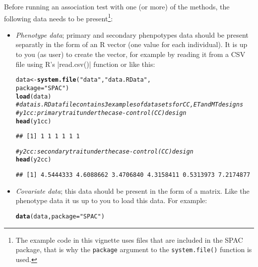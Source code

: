 \documentclass{article}\usepackage[]{graphicx}\usepackage[]{color}
\makeatletter
\newcommand{\hlstr}[1]{\textcolor[rgb]{0.192,0.494,0.8}{#1}}%
\newcommand{\hlcom}[1]{\textcolor[rgb]{0.678,0.584,0.686}{\textit{#1}}}%
\newcommand{\hlstd}[1]{\textcolor[rgb]{0.345,0.345,0.345}{#1}}%
\newcommand{\hlkwb}[1]{\textcolor[rgb]{0.69,0.353,0.396}{#1}}%
\newcommand{\hlkwc}[1]{\textcolor[rgb]{0.333,0.667,0.333}{#1}}%
\newcommand{\hlkwd}[1]{\textcolor[rgb]{0.737,0.353,0.396}{\textbf{#1}}}%
\newenvironment{kframe}{%
 \def\at@end@of@kframe{}%
 \ifinner\ifhmode%
  \def\at@end@of@kframe{\end{minipage}}%
  \begin{minipage}{\columnwidth}%
 \fi\fi%
 \def\FrameCommand##1{\hskip\@totalleftmargin \hskip-\fboxsep
 \colorbox{shadecolor}{##1}\hskip-\fboxsep
     \hskip-\linewidth \hskip-\@totalleftmargin \hskip\columnwidth}%
 \MakeFramed {\advance\hsize-\width
   \@totalleftmargin\z@ \linewidth\hsize
   \@setminipage}}%
 {\par\unskip\endMakeFramed%
 \at@end@of@kframe}
\newenvironment{knitrout}{}{} %
\makeatother
\begin{document}
Before running an association test with one (or more) of the methods,
the following data needs to be present\footnote{The example code in
  this vignette uses files that are included in the SPAC
  package, that is why the \lstinline{package} argument to the
  \lstinline{system.file()} function is used.}:
\begin{itemize}
\item \emph{Phenotype data}; primary and secondary phenpotypes data should be present separatly in the form of
  an R vector (one value for each individual). It is up to you (as user)
  to create the vector, for example by reading it from a CSV file using R's
  |read.csv()| function or like this:
\begin{knitrout}
\color{fgcolor}\begin{kframe}
\begin{alltt}
  \hlstd{data} \hlkwb{<-} \hlkwd{system.file}\hlstd{(}\hlstr{"data"}\hlstd{,}\hlstr{"data.RData"}\hlstd{,}
                            \hlkwc{package}\hlstd{=}\hlstr{"SPAC"}\hlstd{)}
  \hlkwd{load}\hlstd{(data)}
\hlcom{# data is .RData file contains 3 examples of data sets for CC, ET and MT designs}
\hlcom{# y1cc: primary trait under the case-control (CC) design}
  \hlkwd{head}\hlstd{(y1cc)}
\end{alltt}
\begin{verbatim}
## [1] 1 1 1 1 1 1
\end{verbatim}
\begin{alltt}
\hlcom{# y2cc: secondary trait under the case-control (CC) design}
  \hlkwd{head}\hlstd{(y2cc)}
\end{alltt}
\begin{verbatim}
## [1] 4.5444333 4.6088662 3.4706840 4.3158411 0.5313973 7.2174877
\end{verbatim}
\end{kframe}
\end{knitrout}
\item \emph{Covariate data}; this data should be present in the form
  of a matrix. Like the phenotype data it us up to you to load this
  data. For example:
\begin{knitrout}
\color{fgcolor}\begin{kframe}
\begin{alltt}
 
 \hlkwd{data}\hlstd{(data,}\hlkwc{package}\hlstd{=}\hlstr{"SPAC"}\hlstd{)}
  

\end{alltt}
\end{kframe}
\end{knitrout}
\end{itemize}
\end{document}
